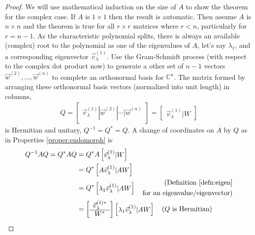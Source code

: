 \begin{proof}
We will use mathematical induction on the size of $A$ to show the theorem for the complex case. If $A$ is $1 \times 1$ then the result is automatic. Then assume $A$ is $n \times n$ and the theorem is true for all $r \times r$ matrices where $r < n$, particularly for $r = n-1$. As the characteristic polynomial splits, there is always an available (complex) root to the polynomial as one of the eigenvalues of $A$, let's say $\lambda_1$, and a corresponding eigenvector $\vec{v}_\lambda^{(1)}$. Use the Gram-Schmidt process (with respect to the complex dot product now) to generate a other set of $n-1$ vectors $\vec{w}^{(2)}, \ldots, \vec{w}^{(n)}$ to complete an orthonormal basis for $\mathbb{C}^n$. The matrix formed by arranging these orthonormal basis vectors (normalized into unit length) in columns,
\begin{align*}
Q = \begin{bmatrix}
\vec{v}_\lambda^{(1)} | \vec{w}^{(2)} | \cdots | \vec{w}^{(n)}
\end{bmatrix} =
\begin{bmatrix}
\vec{v}_\lambda^{(1)} | W
\end{bmatrix}
\end{align*}
is Hermitian and unitary, $Q^{-1} = Q^* = Q$. A change of coordinates on $A$ by $Q$ as in Properties \ref{proper:endomorph} is
\begin{align*}
Q^{-1}AQ = Q^* AQ &= Q^*A\begin{bmatrix}
\vec{v}_\lambda^{(1)} | W
\end{bmatrix} \\
&= Q^*\begin{bmatrix}
A\vec{v}_\lambda^{(1)} | AW
\end{bmatrix} \\
&= Q^*\begin{bmatrix}
\lambda_1\vec{v}_\lambda^{(1)} | AW
\end{bmatrix} \quad \begin{aligned}
\text{(Definition \ref{defn:eigen}} \\
\text{for an eigenvalue/eigenvector)}
\end{aligned} \\
&= 
\left[\begin{array}{c}
\vec{v}_\lambda^{(1)*} \\
\hline
W^*
\end{array}\right]
\begin{bmatrix}
\lambda_1\vec{v}_\lambda^{(1)} | AW
\end{bmatrix} \text{\quad ($Q$ is Hermitian)} \\

\end{align*}
\end{proof}
